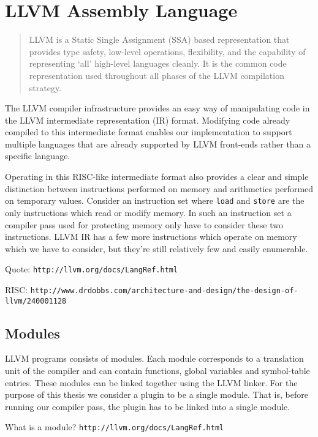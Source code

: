 \chapter {LLVM Assembly Language}

\begin{quote}
LLVM is a Static Single Assignment (SSA) based representation that provides
type safety, low-level operations, flexibility, and the capability of
representing `all' high-level languages cleanly. It is the common code
representation used throughout all phases of the LLVM compilation strategy.
\end{quote}

\noindent The LLVM compiler infrastructure provides an easy way of manipulating
code in the LLVM intermediate representation (IR) format. Modifying code
already compiled to this intermediate format enables our implementation to
support multiple languages that are already supported by LLVM front-ends rather
than a specific language.

Operating in this RISC-like intermediate format also provides a clear and
simple distinction between instructions performed on memory and arithmetics
performed on temporary values. Consider an instruction set where \texttt{load}
and \texttt{store} are the only instructions which read or modify memory. In
such an instruction set a compiler pass used for protecting memory only have to
consider these two instructions. LLVM IR has a few more instructions which
operate on memory which we have to consider, but they're still relatively few
and easily enumerable.

Quote: \texttt{http://llvm.org/docs/LangRef.html}

RISC: \texttt{http://www.drdobbs.com/architecture-and-design/the-design-of-llvm/240001128}

\section {Modules}

LLVM programs consists of modules. Each module corresponds to a translation
unit of the compiler and can contain functions, global variables and
symbol-table entries. These modules can be linked together using the LLVM
linker. For the purpose of this thesis we consider a plugin to be a single
module. That is, before running our compiler pass, the plugin has to be linked
into a single module.

What is a module? \texttt{http://llvm.org/docs/LangRef.html}

